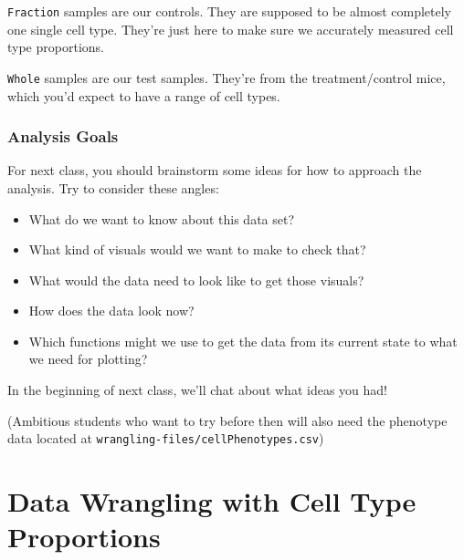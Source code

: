 \documentclass[
  letterpaper,
  DIV=11,
  numbers=noendperiod]{scrreprt}
\providecommand{\tightlist}{%
  \setlength{\itemsep}{0pt}\setlength{\parskip}{0pt}}\usepackage{longtable,booktabs,array}
\begin{document}
\begin{tcolorbox}[enhanced jigsaw, bottomtitle=1mm, bottomrule=.15mm, toprule=.15mm, opacityback=0, leftrule=.75mm, breakable, colback=white, toptitle=1mm, left=2mm, coltitle=black, titlerule=0mm, opacitybacktitle=0.6, title=\textcolor{quarto-callout-note-color}{\faInfo}\hspace{0.5em}{Whole vs.~Fractions}, rightrule=.15mm, arc=.35mm, colframe=quarto-callout-note-color-frame, colbacktitle=quarto-callout-note-color!10!white]

\texttt{Fraction} samples are our controls. They are supposed to be
almost completely one single cell type. They're just here to make sure
we accurately measured cell type proportions.

\texttt{Whole} samples are our test samples. They're from the
treatment/control mice, which you'd expect to have a range of cell
types.

\end{tcolorbox}

\subsection{Analysis Goals}\label{analysis-goals}

For next class, you should brainstorm some ideas for how to approach the
analysis. Try to consider these angles:

\begin{itemize}
\tightlist
\item
  What do we want to know about this data set?
\item
  What kind of visuals would we want to make to check that?
\item
  What would the data need to look like to get those visuals?
\item
  How does the data look now?
\item
  Which functions might we use to get the data from its current state to
  what we need for plotting?
\end{itemize}

In the beginning of next class, we'll chat about what ideas you had!

(Ambitious students who want to try before then will also need the
phenotype data located at \texttt{wrangling-files/cellPhenotypes.csv})


\chapter{Data Wrangling with Cell Type
Proportions}\label{data-wrangling-with-cell-type-proportions}
\end{document}
